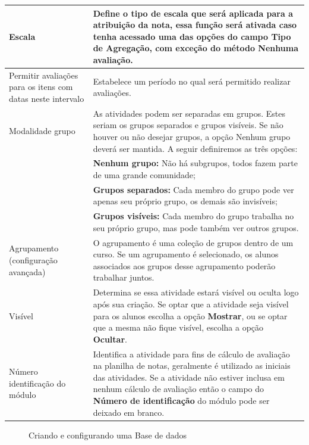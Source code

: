 \begin{longtable}{p{6cm}|p{9cm}}
 {Escala} & Define o tipo de escala que será aplicada para a atribuição da nota, essa função será ativada caso tenha acessado uma das opções do campo \textbf{Tipo de Agregação}, com exceção do método \textbf{Nenhuma avaliação}.\\\hline
 {Permitir avaliações para os itens com datas neste intervalo} & Estabelece um período no qual será permitido realizar avaliações.\\\hline
 {Modalidade grupo} & As atividades podem ser separadas em grupos. Estes seriam os grupos separados e grupos visíveis. Se não houver ou não desejar grupos, a opção Nenhum grupo deverá ser mantida. A seguir definiremos as três opções:\\
 & \textbf{Nenhum grupo:}  Não há subgrupos, todos fazem parte de uma grande comunidade;\\
 & \textbf{Grupos separados:}  Cada membro do grupo pode ver apenas seu próprio grupo, os demais são invisíveis;\\
 & \textbf{Grupos visíveis:}   Cada membro do grupo trabalha no seu próprio grupo, mas pode também ver outros grupos.\\\hline
 {Agrupamento (configuração avançada)} & O agrupamento é uma coleção de grupos dentro de um curso. Se um agrupamento é selecionado, os alunos associados aos grupos desse agrupamento poderão trabalhar juntos.\\\hline
 {Visível} & Determina se essa atividade estará visível ou oculta logo após sua criação. Se optar que a atividade seja visível para os alunos escolha a opção \textbf{Mostrar}, ou se optar que a mesma não fique visível, escolha a opção \textbf{Ocultar}.\\\hline
 {Número identificação do módulo} & Identifica a atividade para fins de cálculo de avaliação na planilha de notas, geralmente é utilizado as iniciais das atividades. Se a atividade não estiver inclusa em nenhum cálculo de avaliação então o campo do \textbf{Número de identificação} do módulo pode ser deixado em branco.\\\hline
\end{longtable}


\begin{figure}[htbp]
 \begin{center}
  \caption{Criando e configurando uma Base de dados}
  \label{fig:cap5_2}
 \end{center}
\end{figure}

